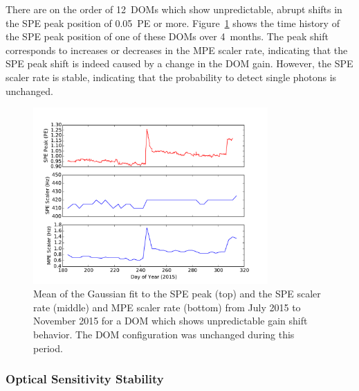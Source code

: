 There are on the
order of 12~DOMs which show unpredictable, abrupt shifts in the SPE peak
position of 0.05~PE or more. Figure~\ref{fig:gainshift_spe} shows the time history of the
SPE peak position of one of these DOMs over 4~months. The peak shift
corresponds to increases or decreases in the MPE scaler rate,
indicating that the SPE peak shift is indeed caused by a change in the DOM
gain. However, the SPE scaler rate is stable, indicating that the
probability to detect single photons is unchanged.

\begin{figure}[!h]
 \centering
 \includegraphics[width=0.8\textwidth]{graphics/dom/reliability/gainshift.pdf}
 \caption{Mean of the Gaussian fit to the SPE peak (top) and the SPE
   scaler rate (middle) and MPE
   scaler rate (bottom) from July 2015 to November 2015 for a DOM
   which shows unpredictable gain shift behavior. The DOM
   configuration was unchanged during this period.}
 \label{fig:gainshift_spe}
\end{figure}

\subsubsection{Optical Sensitivity Stability}

